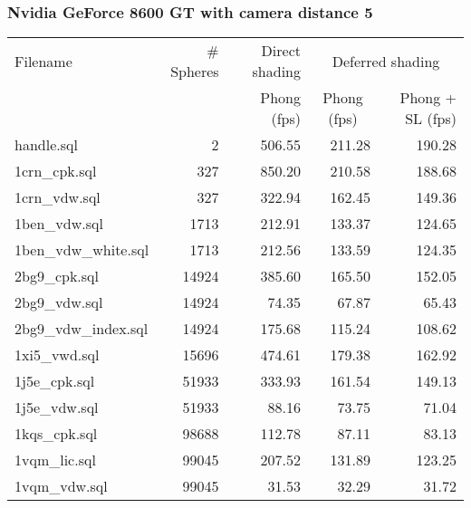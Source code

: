 \subsubsection*{Nvidia GeForce 8600 GT with camera distance 5}
\begin{tabular}{|l|r|r|r|r|}
\hline
Filename & \# Spheres & Direct shading & \multicolumn{2}{|c|}{Deferred shading} \\
         &            & Phong (fps)    & \multicolumn{1}{|c}{Phong (fps)} & Phong + SL (fps) \\  
\hline
\hline
handle.sql & 2 & 506.55 & 211.28 & 190.28 \\
\hline
1crn\_cpk.sql & 327 & 850.20 & 210.58 & 188.68 \\
\hline
1crn\_vdw.sql & 327 & 322.94 & 162.45 & 149.36 \\
\hline
1ben\_vdw.sql & 1713 & 212.91 & 133.37 & 124.65 \\
\hline
1ben\_vdw\_white.sql & 1713 & 212.56 & 133.59 & 124.35 \\
\hline
2bg9\_cpk.sql & 14924 & 385.60 & 165.50 & 152.05 \\
\hline
2bg9\_vdw.sql & 14924 & 74.35 & 67.87 & 65.43 \\
\hline
2bg9\_vdw\_index.sql & 14924 & 175.68 & 115.24 & 108.62 \\
\hline
1xi5\_vwd.sql & 15696 & 474.61 & 179.38 & 162.92 \\
\hline
1j5e\_cpk.sql & 51933 & 333.93 & 161.54 & 149.13 \\
\hline
1j5e\_vdw.sql & 51933 & 88.16 & 73.75 & 71.04 \\
\hline
1kqs\_cpk.sql & 98688 & 112.78 & 87.11 & 83.13 \\
\hline
1vqm\_lic.sql & 99045 & 207.52 & 131.89 & 123.25 \\
\hline
1vqm\_vdw.sql & 99045 & 31.53 & 32.29 & 31.72 \\
\hline
\end{tabular}
